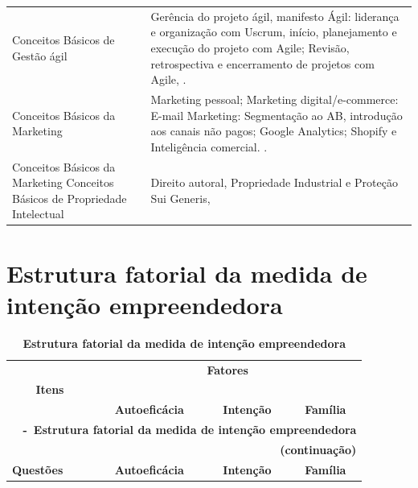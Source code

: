 \begin{apendicesenv}
\begin{longtable}{p{3.5cm}p{11.0cm}}
Conceitos Básicos de Gestão ágil & Gerência do projeto ágil, manifesto Ágil: liderança e organização com Uscrum, início, planejamento e execução do projeto com Agile; Revisão, retrospectiva e encerramento de projetos com Agile, \cite{abrahamsson_agile_2017}. \\ 

Conceitos Básicos da Marketing & Marketing pessoal; Marketing digital/e-commerce: E-mail Marketing: Segmentação ao AB, introdução aos canais não pagos; Google Analytics; Shopify e Inteligência comercial. \cite{ritossa_marketing_2009, rizzo_marketing_2017}. \\ 

Conceitos Básicos da Marketing
Conceitos Básicos de Propriedade Intelectual
 & Direito autoral, Propriedade Industrial e Proteção Sui Generis, \cite{wipo_guide_2019} \\ 

\end{longtable}


\chapter{Estrutura fatorial da medida de intenção empreendedora}
\label{chap:tabela_3}

\begin{longtable}[H]{p{6cm} c c c }
\caption{\textbf{Estrutura fatorial da medida de intenção empreendedora}}
\label{tabela_3}\\
\hline \hline
\multicolumn{1}{p{6cm}}{} & \multicolumn{3}{c}{\textbf{Fatores}}\\ 
 \multicolumn{1}{c}{\textbf{Itens}} & \multicolumn{3}{c}{\hrulefill}\\ 

 \multicolumn{1}{c}{} 
 &\multicolumn{1}{p{1.5cm}}{\textbf{Autoeficácia}} & \multicolumn{1}{p{1.5cm}}{\textbf{Intenção}} &\multicolumn{1}{p{1.5cm}}{\textbf{Família}}  
\\ \hline 

\endfirsthead

\multicolumn{4}{l}{{{\bfseries \tablename \ \thetable{} -\ \textbf{Estrutura fatorial da medida de intenção empreendedora}}}}\\
\multicolumn{4}{r}{\bfseries \textbf{(continuação)}}\\

\hline \multicolumn{1}{p{6cm}}{\textbf{Questões}} &\multicolumn{1}{c}{\textbf{Autoeficácia}} & \multicolumn{1}{c}{\textbf{Intenção}} &\multicolumn{1}{c}{\textbf{Família}}  
\\ \hline 


\end{longtable}
\end{apendicesenv}
